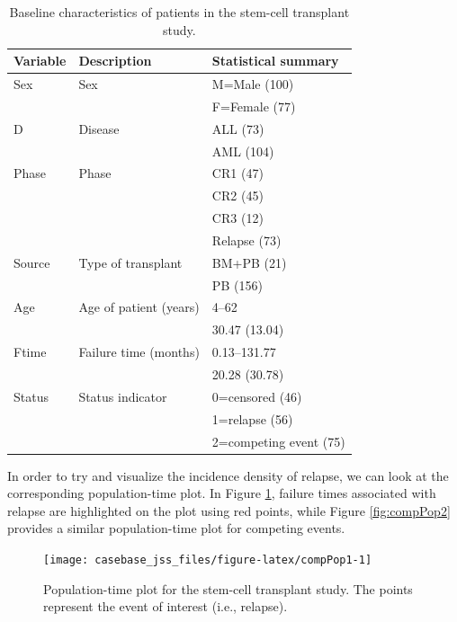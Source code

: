 \documentclass[article]{jss}
\begin{document}
\begin{table}[ht]
\centering
\begin{tabular}{lll}
  \hline
Variable & Description & Statistical summary \\ 
  \hline
Sex & Sex & M=Male (100) \\ 
   &  & F=Female (77) \\ 
  D & Disease & ALL (73) \\ 
   &  & AML (104) \\ 
  Phase & Phase & CR1 (47) \\ 
   &  & CR2 (45) \\ 
   &  & CR3 (12) \\ 
   &  & Relapse (73) \\ 
  Source & Type of transplant & BM+PB (21) \\ 
   &  & PB (156) \\ 
  Age & Age of patient (years) & 4–62 \\ 
   &  & 30.47 (13.04) \\ 
  Ftime & Failure time (months) & 0.13–131.77 \\ 
   &  & 20.28 (30.78) \\ 
  Status & Status indicator & 0=censored (46) \\ 
   &  & 1=relapse (56) \\ 
   &  & 2=competing event (75) \\ 
   \hline
\end{tabular}
\caption{Baseline characteristics of patients in the stem-cell transplant study.}
\label{tab:table1bmtcrr}
\end{table}

In order to try and visualize the incidence density of relapse, we can
look at the corresponding population-time plot. In Figure
\ref{fig:compPop1}, failure times associated with relapse are
highlighted on the plot using red points, while Figure
\ref{fig:compPop2} provides a similar population-time plot for competing
events.

\begin{CodeChunk}
\begin{figure}

{\centering \texttt{[image: casebase\_jss\_files/figure-latex/compPop1-1]} 

}

\caption{\label{fig:compPop1}Population-time plot for the stem-cell transplant study. The points represent the event of interest (i.e., relapse).}\label{fig:compPop1}
\end{figure}
\end{CodeChunk}
\end{document}
